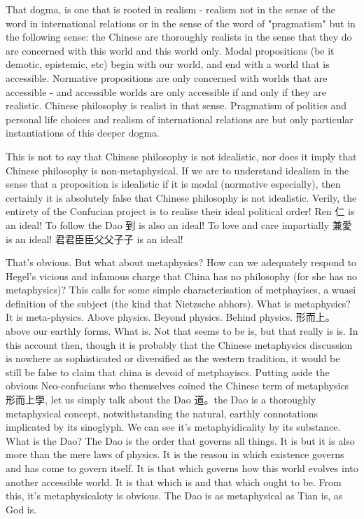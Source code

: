 That dogma, is one that is rooted in realism - realism not in the sense of the word in international relations or in the sense of the word of "pragmatism" but in the following sense: the Chinese are thoroughly realists in the sense that they do are concerned with this world and this world only. Modal propositions (be it demotic, epistemic, etc) begin with our world, and end with a world that is accessible. Normative propositions are only concerned with worlds that are accessible - and accessible worlds are only accessible if and only if they are realistic. Chinese philosophy is realist in that sense. Pragmatism of politics and personal life choices and realism of international relations are but only particular instantiations of this deeper dogma. 

This is not to say that Chinese philosophy is not idealistic, nor does it imply that Chinese philosophy is non-metaphysical. If we are to understand idealism in the sense that a proposition is idealistic if it is modal (normative especially), then certainly it is absolutely false that Chinese philosophy is not idealistic. Verily, the entirety of the Confucian project is to realise their ideal political order! Ren 仁 is an ideal! To follow the Dao 到 is also an ideal! To love and care impartially 兼愛 is an ideal! 君君臣臣父父子子 is an ideal! 

That's obvious. But what about metaphysics? How can we adequately respond to Hegel's vicious and infamous charge that China has no philosophy (for she has no metaphysics)? This calls for some simple characterisation of metphayiscs, a wuasi definition of the subject (the kind that Nietzsche abhors). What is metaphysics? It is meta-physics. Above physics. Beyond physics. Behind physics. 形而上。above our earthly forms. What is. Not that seems to be is, but that really is is. In this account then, though it is probably that the Chinese metaphysics discussion is nowhere as sophisticated or diversified as the western tradition, it would be still be false to claim that china is devoid of metphayiscs. Putting aside the obvious Neo-confucians who themselves coined the Chinese term of metaphysics 形而上學, let us simply talk about the Dao 道。the Dao is a thoroughly metaphysical concept, notwithstanding the natural, earthly connotations implicated by its sinoglyph. We can see it's metaphyidicality by its substance.  
What is the Dao? The Dao is the order that governs all things. It is but it is also more than the mere laws of physics. It is the reason in which existence governs and has come to govern itself. It is that which governs how this world evolves into another accessible world. It is that which is and that which ought to be. From this, it's metaphysicaloty is obvious. The Dao is as metaphysical as Tian is, as God is. 

